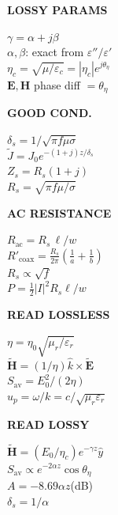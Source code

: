 \documentclass[6pt,letterpaper]{article}
\newcommand{\shead}[3]{%
  \noindent\colorbox{#1}{\parbox{\dimexpr\linewidth-2\fboxsep\relax}%
  {\color{#2}\bfseries\fontsize{6}{7}\selectfont #3}}\vspace{0.5pt}}
\begin{document}
\vfill
\noindent
\begin{minipage}[t]{0.19\linewidth}
\shead{coralbg}{coral}{LOSSY PARAMS}
\begin{ebox}
$\gamma=\alpha+j\beta$\\
$\alpha,\beta$: exact from $\varepsilon''/\varepsilon'$\\
$\eta_c=\sqrt{\mu/\varepsilon_c}=|\eta_c|e^{j\theta_\eta}$\\
$\mathbf{E},\mathbf{H}$ phase diff $=\theta_\eta$
\end{ebox}
\end{minipage}\hfill
\begin{minipage}[t]{0.19\linewidth}
\shead{coralbg}{coral}{GOOD COND.}
\begin{ebox}
$\delta_s=1/\!\sqrt{\pi f\mu\sigma}$\\
$\tilde{J}=J_0e^{-(1+j)z/\delta_s}$\\
$Z_s=R_s(1+j)$\\
$R_s=\sqrt{\pi f\mu/\sigma}$
\end{ebox}
\end{minipage}\hfill
\begin{minipage}[t]{0.19\linewidth}
\shead{coralbg}{coral}{AC RESISTANCE}
\begin{ebox}
$R_\text{ac}=R_s\,\ell/w$\\
$R'_\text{coax}=\frac{R_s}{2\pi}(\frac{1}{a}+\frac{1}{b})$\\
$R_s\propto\sqrt{f}$\\
$P=\tfrac{1}{2}|I|^2 R_s\ell/w$
\end{ebox}
\end{minipage}\hfill
\begin{minipage}[t]{0.19\linewidth}
\shead{graybg}{gray}{READ LOSSLESS}
\begin{ebox}
$\eta=\eta_0\sqrt{\mu_r/\varepsilon_r}$\\
$\tilde{\mathbf{H}}=(1/\eta)\hat{k}\times\tilde{\mathbf{E}}$\\
$S_\text{av}=E_0^2/(2\eta)$\\
$u_p=\omega/k=c/\sqrt{\mu_r\varepsilon_r}$
\end{ebox}
\end{minipage}\hfill
\begin{minipage}[t]{0.19\linewidth}
\shead{graybg}{gray}{READ LOSSY}
\begin{ebox}
$\tilde{\mathbf{H}}=(E_0/\eta_c)e^{-\gamma z}\hat{y}$\\
$S_\text{av}\!\propto\!e^{-2\alpha z}\cos\theta_\eta$\\
$A=-8.69\alpha z$\;(dB)\\
$\delta_s=1/\alpha$
\end{ebox}
\end{minipage}
\end{document}
